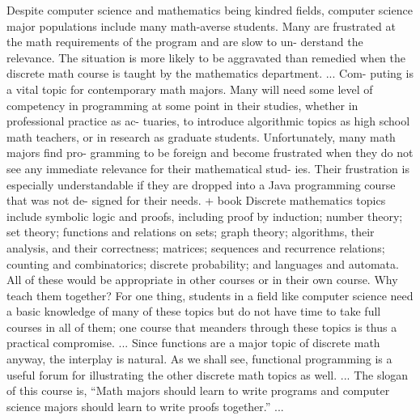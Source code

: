 Despite computer science and mathematics being kindred fields,
computer science major populations include many math-averse
students. Many are frustrated at the math requirements of the program
and are slow to un-
derstand the relevance. The situation is more likely to be aggravated than remedied when the discrete math course is taught by the mathematics department.
...
Com- puting is a vital topic for contemporary math majors. Many will
need some level of competency in programming at some point in their
studies, whether in professional practice as ac- tuaries, to introduce
algorithmic topics as high school math teachers, or in research as
graduate students. 
Unfortunately, many math majors find pro- gramming to be foreign and become frustrated when they do not see any immediate relevance for their mathematical stud- ies. Their frustration is especially understandable if they are dropped into a Java programming course that was not de- signed for their needs.
+
book \cite{bookvandrunen}
Discrete mathematics topics include symbolic logic and proofs, including proof by induction; number theory; set theory; functions and relations on sets; graph theory; algorithms, their analysis, and their correctness; matrices; sequences and recurrence relations; counting and combinatorics; discrete probability; and languages and automata. All of these would be appropriate in other courses or in their own course. Why teach them together? For one thing, students in a field like computer science need a basic knowledge of many of these topics but do not have time to take full courses in all of them; one course that meanders through these topics is thus a practical compromise.
...
Since functions are a major topic of discrete math anyway, the interplay is natural. As we shall see, functional programming is a useful forum for illustrating the other discrete math topics as well.
...
The slogan of this course is, “Math majors should learn to write
programs and computer science majors should learn to write proofs
together.”
...